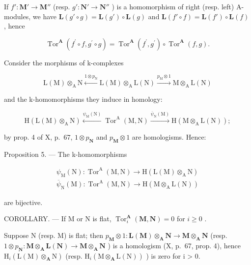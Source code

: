 If \(f': \mathbf{M}' \to \mathbf{M}''\) (resp. \(g': \mathbf{N}' \to \mathbf{N}''\) ) is a homomorphism of right (resp. left) A-modules, we have \(\mathbf{L}(g' \circ g) = \mathbf{L}(g') \circ \mathbf{L}(g)\) and \(\mathbf{L}(f' \circ f) = \mathbf{L}(f') \circ \mathbf{L}(f)\) , hence

\[
\operatorname{Tor} ^ {\mathbf {A}} \left(f ^ {\prime} \circ f, g ^ {\prime} \circ g\right) = \operatorname{Tor} ^ {\mathbf {A}} \left(f ^ {\prime}, g ^ {\prime}\right) \circ \operatorname{Tor} ^ {\mathbf {A}} (f, g).\tag{9}
\]

Consider the morphisms of k-complexes

\[
\mathrm{L} (\mathrm{M}) \otimes_ {\mathrm{A}} \mathrm{N} \xleftarrow {1 \otimes p _ {\mathrm{N}}} \mathrm{L} (\mathrm{M}) \otimes_ {\mathrm{A}} \mathrm{L} (\mathrm{N}) \xrightarrow {p _ {\mathrm{M}} \otimes 1} \mathrm{M} \otimes_ {\mathrm{A}} \mathrm{L} (\mathrm{N})
\]

and the k-homomorphisms they induce in homology:

\[
\mathrm{H} (\mathrm{L} (\mathrm{M}) \otimes_ {\mathrm{A}} \mathrm{N}) \xleftarrow {\psi_ {\mathrm{M}} (\mathrm{N})} \operatorname{Tor} ^ {\mathrm{A}} (\mathrm{M}, \mathrm{N}) \xrightarrow {\overline {{\psi}} _ {\mathrm{N}} (\mathrm{M})} \mathrm{H} (\mathrm{M} \otimes_ {\mathrm{A}} \mathrm{L} (\mathrm{N}));
\]

by prop. 4 of X, p.~67, \(1 \otimes p_{\mathbf{N}}\) and \(p_{\mathbf{M}} \otimes 1\) are homologisms. Hence:

Proposition 5. --- The k-homomorphisms

\[
\begin{array}{l} \psi_ {\mathrm{M}} (\mathrm{N}): \operatorname{Tor} ^ {\mathrm{A}} (\mathrm{M}, \mathrm{N}) \to \mathrm{H} (\mathrm{L} (\mathrm{M}) \otimes_ {\mathrm{A}} \mathrm{N}) \\ \overline {{\psi}} _ {\mathrm{N}} (\mathrm{M}): \operatorname{Tor} ^ {\mathrm{A}} (\mathrm{M}, \mathrm{N}) \to \mathrm{H} (\mathrm{M} \otimes_ {\mathrm{A}} \mathrm{L} (\mathrm{N})) \end{array}
\]

are bijective.

COROLLARY. --- If M or N is flat, \(\operatorname{Tor}_{i}^{\mathbf{A}}(\mathbf{M},\mathbf{N}) = 0\) for \(i \geqslant 0\) .

Suppose N (resp. M) is flat; then \(p_{\mathbf{M}} \otimes 1 : \mathbf{L}(\mathbf{M}) \otimes_{\mathbf{A}} \mathbf{N} \to \mathbf{M} \otimes_{\mathbf{A}} \mathbf{N}\) (resp. \(1 \otimes p_{\mathbf{N}} : \mathbf{M} \otimes_{\mathbf{A}} \mathbf{L}(\mathbf{N}) \to \mathbf{M} \otimes_{\mathbf{A}} \mathbf{N}\) ) is a homologism (X, p.~67, prop. 4), hence \(\mathrm{H}_{i}(\mathrm{L}(\mathrm{M}) \otimes_{\mathbf{A}} \mathrm{N})\) (resp. \(\mathrm{H}_{i}(\mathrm{M} \otimes_{\mathbf{A}} \mathrm{L}(\mathrm{N}))\) ) is zero for i \textgreater{} 0.

